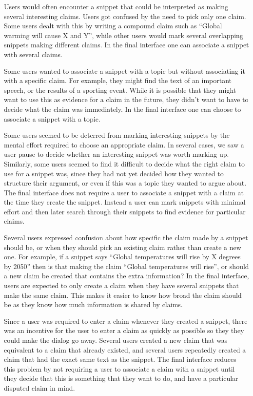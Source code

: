 \documentclass{chi2009}
\begin{document}
Users would often encounter a snippet that could be interpreted as making several interesting claims. Users got confused by the need to pick only one claim. Some users dealt with this by writing a compound claim such as ``Global warming will cause X and Y'', while other users would mark several overlapping snippets making different claims. In the final interface one can associate a snippet with several claims.

Some users wanted to associate a snippet with a topic but without associating it with a specific claim. For example, they might find the text of an important speech, or the results of a sporting event. While it is possible that they might want to use this as evidence for a claim in the future, they didn't want to have to decide what the claim was immediately. In the final interface one can choose to associate a snippet with a topic.

Some users seemed to be deterred from marking interesting snippets by the mental effort required to choose an appropriate claim. In several cases, we saw a user pause to decide whether an interesting snippet was worth marking up. Similarly, some users seemed to find it difficult to decide what the right claim to use for a snippet was, since they had not yet decided how they wanted to structure their argument, or even if this was a topic they wanted to argue about. The final interface does not require a user to associate a snippet with a claim at the time they create the snippet. Instead a user can mark snippets with minimal effort and then later search through their snippets to find evidence for particular claims.

Several users expressed confusion about how specific the claim made by a snippet should be, or when they should pick an existing claim rather than create a new one. For example, if a snippet says ``Global temperatures will rise by X degrees by 2050'' then is that making the claim ``Global temperatures will rise'', or should a new claim be created that contains the extra information? In the final interface, users are expected to only create a claim when they have several snippets that make the same claim. This makes it easier to know how broad the claim should be as they know how much information is shared by claims.

Since a user was required to enter a claim whenever they created a snippet, there was an incentive for the user to enter a claim as quickly as possible so they they could make the dialog go away. Several users created a new claim that was equivalent to a claim that already existed, and several users repeatedly created a claim that had the exact same text as the snippet. The final interface reduces this problem by not requiring a user to associate a claim with a snippet until they decide that this is something that they want to do, and have a particular disputed claim in mind.
\end{document}
